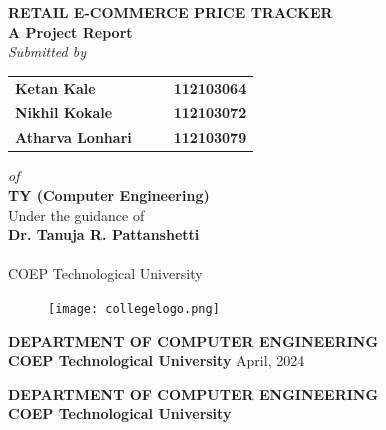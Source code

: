 \documentclass[a4paper,14pt,onecolumn]{report}
\begin{document}
	\pagestyle{empty}
	\begin{titlepage}
		\begin{center}
			\LARGE{\bf{RETAIL E-COMMERCE PRICE TRACKER\\}}	%
			\vspace{10pt}
			\Large{\bf{A Project Report\\}}		%
			\Large{\em{Submitted by\\}}
			\begin{table}[htbp]
				\begin{center}
					\begin{tabular}{ l c c l }
						\Large\bf{Ketan Kale} & & & \Large\bf{112103064} \\
						\Large\bf{Nikhil Kokale} & & & \Large\bf{112103072} \\
						\Large\bf{Atharva Lonhari} & & & \Large\bf{112103079} \\[0.3cm] 
						
					\end{tabular}
				\end{center}
			\end{table}
			\Large{\em{of\\}}
			\LARGE{\bf{TY  (Computer Engineering)\\}}%
			\vspace{20pt}
			\Large{Under the guidance of\\ }
			\Large{\bf{Dr. Tanuja R. Pattanshetti \\ }\\}
			\Large{COEP Technological University\\}
			\vspace{10pt}
			\begin{figure}[h]
				\centering
				\texttt{[image: collegelogo.png]}
			\end{figure}
			\Large{\bf{DEPARTMENT OF COMPUTER ENGINEERING\\ 
					COEP Technological University}}
			\vfill
			\large{April, 2024}
		\end{center}
	\end{titlepage}
	
	\thispagestyle{empty}
	\linespread{2}
	\begin{center}			%
		\Large{\bf{DEPARTMENT OF COMPUTER ENGINEERING\\ 
				COEP Technological University\\}}	
	\end{center}
	
\end{document}
